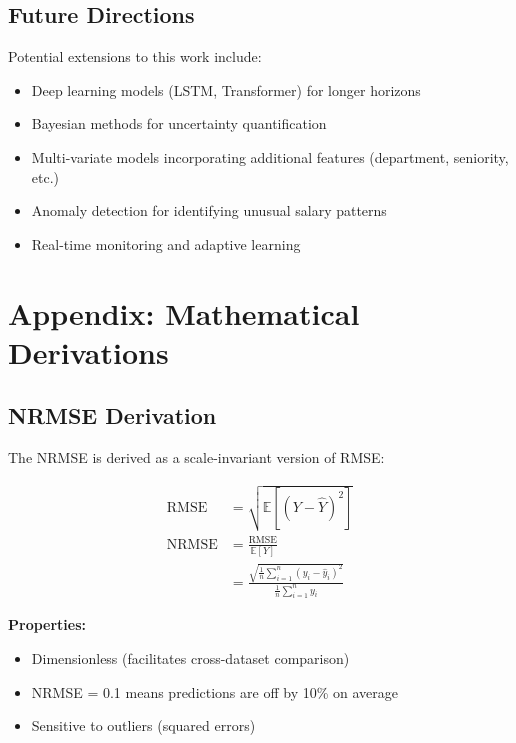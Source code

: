 \documentclass[12pt,a4paper]{article}
\begin{document}
\subsection{Future Directions}

Potential extensions to this work include:

\begin{itemize}
    \item Deep learning models (LSTM, Transformer) for longer horizons
    \item Bayesian methods for uncertainty quantification
    \item Multi-variate models incorporating additional features (department, seniority, etc.)
    \item Anomaly detection for identifying unusual salary patterns
    \item Real-time monitoring and adaptive learning
\end{itemize}

\section{Appendix: Mathematical Derivations}

\subsection{NRMSE Derivation}

The NRMSE is derived as a scale-invariant version of RMSE:

\begin{align}
\text{RMSE} &= \sqrt{\mathbb{E}[(Y - \hat{Y})^2]} \\
\text{NRMSE} &= \frac{\text{RMSE}}{\mathbb{E}[Y]} \\
&= \frac{\sqrt{\frac{1}{n}\sum_{i=1}^{n}(y_i - \hat{y}_i)^2}}{\frac{1}{n}\sum_{i=1}^{n}y_i}
\end{align}

\textbf{Properties:}
\begin{itemize}
    \item Dimensionless (facilitates cross-dataset comparison)
    \item NRMSE = 0.1 means predictions are off by 10\% on average
    \item Sensitive to outliers (squared errors)
\end{itemize}
\end{document}
